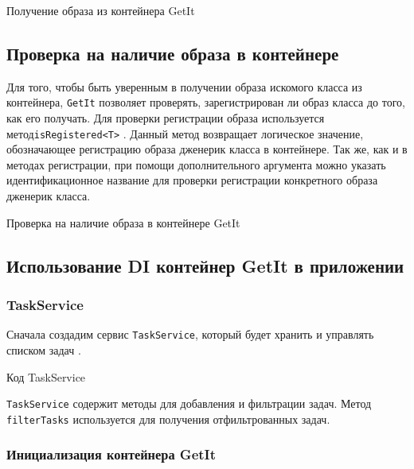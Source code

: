 \begin{image}
	\caption{Получение образа из контейнера GetIt}
	\label{fig:getit:instance:get}
\end{image}

\subsection{Проверка на наличие образа в контейнере}

Для того, чтобы быть уверенным в получении образа искомого класса
из контейнера, \texttt{GetIt} позволяет проверять,
зарегистрирован ли образ класса до того, как его получать.
Для проверки регистрации образа используется метод\texttt{isRegistered<T>} 
.
Данный метод возвращает логическое значение,
обозначающее регистрацию образа дженерик класса в контейнере.
Так же, как и в методах регистрации,
при помощи дополнительного аргумента можно указать идентификационное название
для проверки регистрации конкретного образа дженерик класса.

\begin{image}
	\caption{Проверка на наличие образа в контейнере GetIt}
	\label{fig:getit:isregistered}
\end{image}

\subsection{Использование DI контейнер GetIt в приложении}

\subsubsection{TaskService}

Сначала создадим сервис \texttt{TaskService},
который будет хранить и управлять списком задач .

\begin{image}
	\caption{Код TaskService}
	\label{fig:getit:class}
\end{image}

\texttt{TaskService} содержит методы для добавления и фильтрации задач.
Метод \texttt{filterTasks} используется для получения отфильтрованных задач.

\subsubsection{Инициализация контейнера GetIt}

